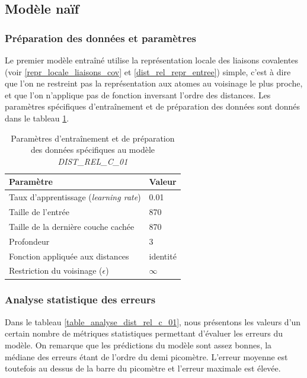 \subsection{Modèle naïf}

\label{dist_rel_c_naif}

\subsubsection{Préparation des données et paramètres}
Le premier modèle entraîné utilise la représentation locale des liaisons covalentes (voir \ref{repr_locale_liaisons_cov} et \ref{dist_rel_repr_entree}) simple, c'est à dire que l'on ne restreint pas la représentation aux atomes au voisinage le plus proche, et que l'on n'applique pas de fonction inversant l'ordre des distances. Les paramètres spécifiques d'entraînement et de préparation des données sont donnés dans le tableau \ref{table_params_dist_rel_c_01}.

\begin{table}
	\centering
	\begin{tabular}{|l|l|}
		\hline
		\textbf{Paramètre} & \textbf{Valeur} \\ \hline
		Taux d'apprentissage (\emph{learning rate}) & 0.01 \\ \hline
		Taille de l'entrée & 870 \\ \hline
		Taille de la dernière couche cachée & 870 \\ \hline
		Profondeur & 3 \\ \hline
		Fonction appliquée aux distances & identité \\ \hline
		Restriction du voisinage ($\epsilon$) & $\infty$ \\ \hline
	\end{tabular}

	\caption{Paramètres d'entraînement et de préparation des données spécifiques au modèle \emph{DIST\_REL\_C\_01}}
	\label{table_params_dist_rel_c_01}
\end{table}

\subsubsection{Analyse statistique des erreurs}
\par Dans le tableau \ref{table_analyse_dist_rel_c_01}, nous présentons les valeurs d'un certain nombre de métriques statistiques permettant d'évaluer les erreurs du modèle. On remarque que les prédictions du modèle sont assez bonnes, la médiane des erreurs étant de l'ordre du demi picomètre. L'erreur moyenne est toutefois au dessus de la barre du picomètre et l'erreur maximale est élevée.

